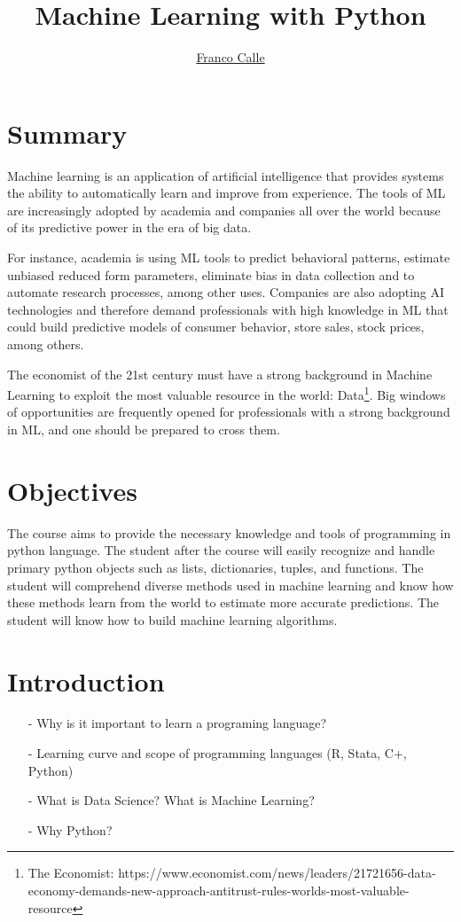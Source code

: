 \documentclass[12pt]{article}
\title{Machine Learning with Python}
\author{\href{http://users.nber.org/~callef/}{Franco Calle}}
\date{}
\begin{document}
\maketitle


\section*{Summary}
Machine learning is an application of artificial intelligence that provides systems the ability to automatically learn and improve from experience. The tools of ML are increasingly adopted by academia and companies all over the world because of its predictive power in the era of big data.

For instance, academia is using ML tools to predict behavioral patterns, estimate unbiased reduced form parameters, eliminate bias in data collection and to automate research processes, among other uses. Companies are also adopting AI technologies and therefore demand professionals with high knowledge in ML that could build predictive models of consumer behavior, store sales, stock prices, among others.

The economist of the 21st century must have a strong background in Machine Learning to exploit the most valuable resource in the world: Data\footnote{The Economist: https://www.economist.com/news/leaders/21721656-data-economy-demands-new-approach-antitrust-rules-worlds-most-valuable-resource}. Big windows of opportunities are frequently opened for professionals with a strong background in ML, and one should be prepared to cross them.

\section*{Objectives}

The course aims to provide the necessary knowledge and tools of programming in python language. The student after the course will easily recognize and handle primary python objects such as lists, dictionaries, tuples, and functions.
The student will comprehend diverse methods used in machine learning and know how these methods learn from the world to estimate more accurate predictions.
The student will know how to build machine learning algorithms.

\section*{Introduction}
  
\begin{itemize}
\item[-] Why is it important to learn a programing language?
\item[-] Learning curve and scope of programming languages (R, Stata, C+, Python)
\item[-] What is Data Science? What is Machine Learning?
\item[-] Why Python?
\end{itemize}
\end{document}
